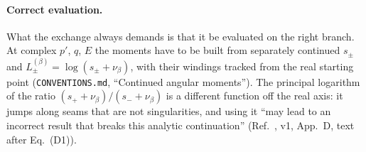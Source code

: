 \documentclass[11pt]{article}
\newcommand{\file}[1]{\nolinkurl{#1}}
\begin{document}
\paragraph{Correct evaluation.}
What the exchange always demands is that it be evaluated on the right branch. At complex $p'$, $q$, $E$ the moments have to be built from separately continued $s_\pm$ and $L^{(\beta)}_\pm=\log(s_\pm+\nu_\beta)$, with their windings tracked from the real starting point (\file{CONVENTIONS.md}, ``Continued angular moments''). The principal logarithm of the ratio $(s_++\nu_\beta)/(s_-+\nu_\beta)$ is a different function off the real axis: it jumps along seams that are not singularities, and using it ``may lead to an incorrect result that breaks this analytic continuation'' (Ref.~\cite{Wu:2026wxb}, v1, App.~D, text after Eq.~(D1)).
\end{document}

